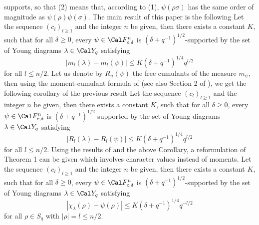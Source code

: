  supports, so that (2) means that, according to (1),
  $\psi(\rho\sigma)$ has the same order of magnitude as
  $\psi(\rho)\psi(\sigma)$.
 The main result of this paper is the following
  Let the sequence $(c_l)_{l\geq 1}$ and the integer
 $n$ be given, then there exists a constant
 $K$, such that for all $\delta\geq 0$,  every
  $\psi\in\Cal F_{c,\delta}^n$ is $(\delta+q^{-1})^{1/2}$-supported by
   the set of Young diagrams $\lambda\in\Cal Y_q$
  satisfying 
  $$|m_l(\lambda)-m_l(\psi)|\leq
 K(\delta+q^{-1})^{1/4}q^{l/ 2} $$ for all
 $l\leq n/2$.
 \endproclaim
 Let us denote by $R_n(\psi)$ the free 
 cumulants of the measure $m_{\psi}$, then using the moment-cumulant formula
 of \cite{S} (see also Section 2 of \cite{B}), we
 get 
 the following corollary of the previous result
  Let the sequence $(c_l)_{l\geq 1}$ and the integer
   $n$ be given, then there exists a constant
 $K$, such that for all $\delta\geq 0$,  every
  $\psi\in\Cal F_{c,\delta}^n$ is $(\delta+q^{-1})^{1/2}$-supported by
   the set of Young diagrams $\lambda\in\Cal Y_q$
  satisfying 
  $$|R_l(\lambda)-R_l(\psi)|\leq
 K(\delta+q^{-1})^{1/4}q^{l/ 2} $$ for all
 $l\leq n/2$.
 \endproclaim
 Using the results of \cite{B} and the above Corollary, 
 a reformulation of Theorem 1 can be given which
 involves character values instead of moments.
  Let the sequence $(c_l)_{l\geq 1}$ and the integer
 $n$ be given, then there exists a constant
 $K$, such that for all $\delta\geq 0$, every
  $\psi\in\Cal F_{c,\delta}^n$ is $(\delta+q^{-1})^{1/2}$-supported 
  by the set of Young diagrams $\lambda\in\Cal Y_q$
  satisfying 
$$|\chi_{\lambda}(\rho)-\psi(\rho)|\leq
 K(\delta+q^{-1})^{1/4}q^{-l/2} $$ for all $\rho\in S_q$ with 
 $|\rho|=l\leq n/2$.
 \endproclaim


